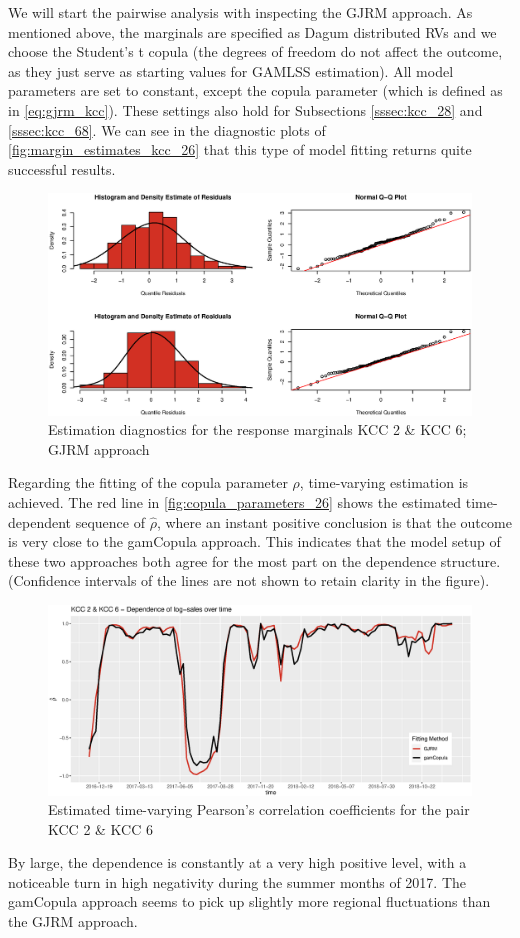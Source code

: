 
We will start the pairwise analysis with inspecting the \ac{GJRM} approach. As mentioned above, the marginals are specified as Dagum distributed \acp{RV} and we choose the Student's t copula (the degrees of freedom do not affect the outcome, as they just serve as starting values for \ac{GAMLSS} estimation). All model parameters are set to constant, except the copula parameter (which is defined as in \autoref{eq:gjrm_kcc}). These settings also hold for Subsections \ref{sssec:kcc_28} and \ref{sssec:kcc_68}. We can see in the diagnostic plots of \autoref{fig:margin_estimates_kcc_26} that this type of model fitting returns quite successful results. \\

\begin{figure}[H]
\centering
  \includegraphics[width=0.9\linewidth]{figures/margin_estimates_kcc_26.eps}
  \caption{Estimation diagnostics for the response marginals KCC 2 \& KCC 6; \ac{GJRM} approach}
  \label{fig:margin_estimates_kcc_26}
\end{figure}

Regarding the fitting of the copula parameter $\rho$, time-varying estimation is achieved. The red line in \autoref{fig:copula_parameters_26} shows the estimated time-dependent sequence of $\hat{\rho}$, where an instant positive conclusion is that the outcome is very close to the gamCopula approach. This indicates that the model setup of these two approaches both agree for the most part on the dependence structure. (Confidence intervals of the lines are not shown to retain clarity in the figure).\\


\begin{figure}[H]
\centering
  \includegraphics[width=0.9\linewidth]{figures/copula_parameters_26.eps}
  \caption{Estimated time-varying Pearson's correlation coefficients for the pair KCC 2 \& KCC 6}
  \label{fig:copula_parameters_26}
\end{figure}


By large, the dependence is constantly at a very high positive level, with a noticeable turn in high negativity during the summer months of 2017. The gamCopula approach seems to pick up slightly more regional fluctuations than the \ac{GJRM} approach.






